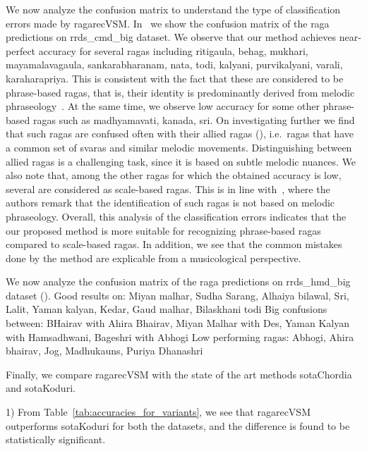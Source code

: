 We now analyze the confusion matrix to understand the type of classification errors made by \acrshort{ragarecVSM}. In~ we show the confusion matrix of the \gls{raga} predictions on \acrshort{rrds_cmd_big} dataset. We observe that our method achieves near-perfect accuracy for several \glspl{raga} including \gls{ritigaula}, \gls{behag}, \gls{mukhari}, \gls{mayamalavagaula}, \gls{sankarabharanam}, \gls{nata}, \gls{todi}, \gls{kalyani}, \gls{purvikalyani}, \gls{varali}, \gls{karaharapriya}. This is consistent with the fact that these are considered to be phrase-based \glspl{raga}, that is, their identity is predominantly derived from melodic phraseology~\citep{krishna2012carnatic}. At the same time, we observe low accuracy for some other phrase-based \glspl{raga} such as \gls{madhyamavati}, \gls{kanada}, \gls{sri}. On investigating further we find that such \glspl{raga} are confused often with their allied \glspl{raga} (), i.e.~\glspl{raga} that have a common set of \glspl{svara} and similar melodic movements. Distinguishing between allied \glspl{raga} is a challenging task, since it is based on subtle melodic nuances. We also note that, among the other \glspl{raga} for which the obtained accuracy is low, several are considered as scale-based \glspl{raga}. This is in line with~\cite{krishna2012carnatic}, where the authors remark that the identification of such \glspl{raga} is not based on melodic phraseology. Overall, this analysis of the classification errors indicates that the our proposed method is more suitable for recognizing phrase-based \glspl{raga} compared to scale-based \glspl{raga}. In addition, we see that the common mistakes done by the method are explicable from a musicological perspective. 

We now analyze the confusion matrix of the \gls{raga} predictions on \acrshort{rrds_hmd_big} dataset ().
Good results on: Miyan malhar, Sudha Sarang, Alhaiya bilawal, Sri, Lalit, Yaman kalyan, Kedar, Gaud malhar, Bilaskhani todi
Big confusions between: BHairav with Ahira Bhairav, Miyan Malhar with Des, Yaman Kalyan with Hamsadhwani, Bageshri with Abhogi
Low performing ragas: Abhogi, Ahira bhairav, Jog, Madhukauns, Puriya Dhanashri

Finally, we compare \acrshort{ragarecVSM} with the state of the art methods \acrshort{sotaChordia} and \acrshort{sotaKoduri}. 

1) From Table~\ref{tab:accuracies_for_variants}, we see that \acrshort{ragarecVSM} outperforms \acrshort{sotaKoduri} for both the datasets, and the difference is found to be statistically significant. 

